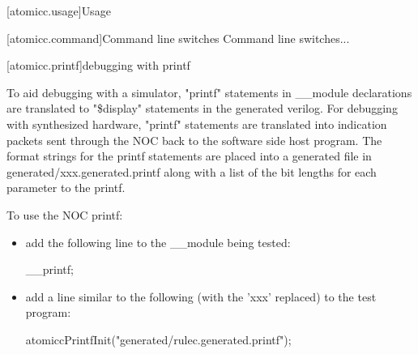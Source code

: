 [atomicc.usage]{Usage}

[atomicc.command]{Command line switches}
Command line switches...

[atomicc.printf]{debugging with printf}

To aid debugging with a simulator, "printf" statements in __module declarations are
translated to "\$display" statements in the generated verilog.
For debugging with synthesized hardware, "printf" statements are translated into
indication packets sent through the NOC back to the software side host program.
The format strings for the printf statements are placed into a generated file
in generated/xxx.generated.printf along with a list of the bit lengths for each
parameter to the printf.

\begin{bnf}
\br
\end{bnf}

To use the NOC printf:
\begin{itemize}
\item add the following line to the __module being tested:
\begin{codeblock}
     __printf;
\end{codeblock}
\item add a line similar to the following (with the 'xxx' replaced) to the test program:
\begin{codeblock}
     atomiccPrintfInit("generated/rulec.generated.printf");
\end{codeblock}
\end{itemize}
